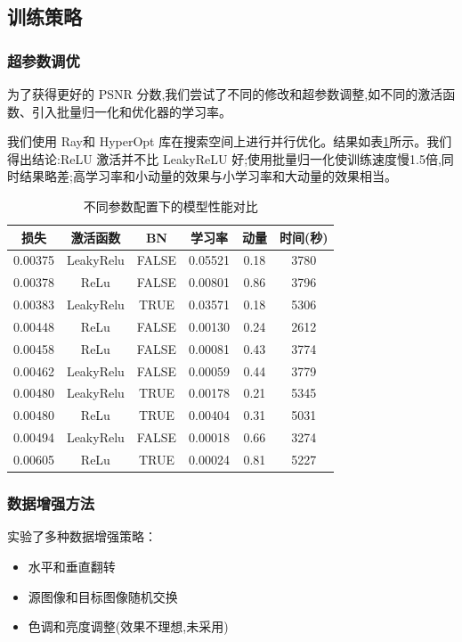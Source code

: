 \documentclass[UTF8]{ctexart}
\begin{document}
\subsection{训练策略}

\subsubsection{超参数调优}
为了获得更好的 PSNR 分数,我们尝试了不同的修改和超参数调整,如不同的激活函数、引入批量归一化和优化器的学习率。

我们使用 Ray和 HyperOpt 库在搜索空间上进行并行优化。结果如表\ref{tab:hyperparameters}所示。我们得出结论:ReLU 激活并不比 LeakyReLU 好;使用批量归一化使训练速度慢1.5倍,同时结果略差;高学习率和小动量的效果与小学习率和大动量的效果相当。


\begin{table}[htbp]
    \centering
    \caption{不同参数配置下的模型性能对比}
    \begin{tabular}{|c|c|c|c|c|c|}
    \hline
    损失 & 激活函数 & BN & 学习率 & 动量 & 时间(秒) \\
    \hline
    0.00375 & LeakyRelu & FALSE & 0.05521 & 0.18 & 3780 \\
    0.00378 & ReLu & FALSE & 0.00801 & 0.86 & 3796 \\
    0.00383 & LeakyRelu & TRUE & 0.03571 & 0.18 & 5306 \\
    0.00448 & ReLu & FALSE & 0.00130 & 0.24 & 2612 \\
    0.00458 & ReLu & FALSE & 0.00081 & 0.43 & 3774 \\
    0.00462 & LeakyRelu & FALSE & 0.00059 & 0.44 & 3779 \\
    0.00480 & LeakyRelu & TRUE & 0.00178 & 0.21 & 5345 \\
    0.00480 & ReLu & TRUE & 0.00404 & 0.31 & 5031 \\
    0.00494 & LeakyRelu & FALSE & 0.00018 & 0.66 & 3274 \\
    0.00605 & ReLu & TRUE & 0.00024 & 0.81 & 5227 \\
    \hline
    \end{tabular}
    \label{tab:hyperparameters}
    \end{table}

\subsubsection{数据增强方法}
实验了多种数据增强策略：
\begin{itemize}
    \item 水平和垂直翻转
    \item 源图像和目标图像随机交换
    \item 色调和亮度调整(效果不理想,未采用)
\end{itemize}
\end{document}
